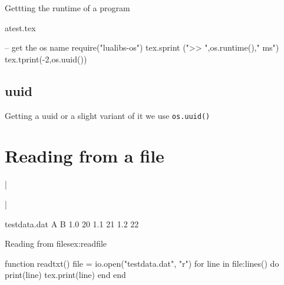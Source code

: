 Gettting the runtime of a program

\begin{tcblisting}{}
\begin{filecontents}{atest.tex}
\end{filecontents}
\begin{luacode}
  -- get the os name
  require("lualibs-os")
  tex.sprint (">> ",os.runtime()," ms")
  tex.tprint({-2,os.uuid()})
\end{luacode}
\end{tcblisting}

\subsection{uuid}
Getting a uuid or a slight variant of it we use \lstinline!os.uuid()!

\section{Reading from a file}

|\usepackage{luatextra}|


\begin{filecontents}{testdata.dat}
  A  B
  1.0 20
  1.1 21
  1.2 22
\end{filecontents}

\begin{texexample}{Reading from files}{ex:readfile}
\begin{luacode}
  function readtxt()
    file = io.open("testdata.dat", "r")
    for line in file:lines() do
      print(line)
      tex.print(line)
    end
  end
\end{luacode}
\end{texexample}














